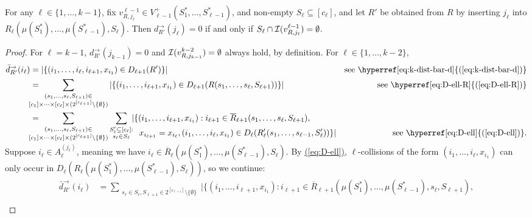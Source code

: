\documentclass{article}
\newcommand{\eq}[1]{\hyperref[eq:#1]{(\ref*{eq:#1})}}
\renewcommand{\>}{\rangle}
\newcommand{\<}{\langle}
\renewcommand{\(}{\left(}
\renewcommand{\)}{\right)}
\begin{document}
\begin{lemma}\label{lem:faults-equiv}
For any $\ell\in\{1,\dots,k-1\}$, fix $v^{\ell-1}_{R,j_{\ell}}\in V_{\ell-1}^+(S_1^*,\dots,S_{\ell-1}^*)$, and non-empty $S_{\ell}\subseteq [c_{\ell}]$, and let $R'$ be obtained from $R$ by inserting $j_{\ell}$ into $R_{\ell}(\mu(S_1^*),\dots,\mu(S_{\ell-1}^*),S_{\ell})$. Then $d^{\rightarrow}_{R'}(j_{\ell})=0$ if and only if $S_{\ell}\cap {\cal I}(v^{\ell-1}_{R,j_{\ell}})=\emptyset$. 
\end{lemma}
\begin{proof}
For $\ell=k-1$, $d_{R'}^{\rightarrow}(j_{k-1})=0$ and ${\cal I}(v^{k-2}_{R,j_{k-1}})=\emptyset$ always hold, by definition. 
For $\ell\in\{1,\dots,k-2\}$,
\begin{align*}
\bar{d}_{R'}^{\rightarrow}(i_{\ell}) &= |\{(i_1,\dots,i_{\ell},i_{\ell+1},x_{i_1})\in D_{\ell+1}(R')\}| & \mbox{see \eq{k-dist-bar-d}}\\
&= \!\!\!\!\!\!\!\!\!\sum_{\substack{(s_1,\dots,s_{\ell},S_{\ell+1})\in\\ [c_1]\times\dots\times[c_{\ell}]\times (2^{[c_{\ell+1}]}\setminus\{\emptyset\})}}
|\{(i_1,\dots,i_{\ell+1},x_{i_1})\in D_{\ell+1}(R(s_1,\dots,s_{\ell},S_{\ell+1}))\}| & \mbox{see \eq{D-ell-R}}\\
&= \!\!\!\!\!\!\!\!\!\sum_{\substack{(s_1,\dots,s_{\ell},S_{\ell+1})\in\\ [c_1]\times\dots\times[c_{\ell}]\times (2^{[c_{\ell+1}]}\setminus\{\emptyset\})}}
\sum_{\substack{S_{\ell}'\subseteq[c_{\ell}]:\\ s_{\ell}\in S_{\ell}}}\!\!
|\{(i_1,\dots,i_{\ell+1},x_{i_1}):  i_{\ell+1}\in\overline{R}_{\ell+1}(s_1,\dots,s_{\ell},S_{\ell+1}),\\[-20pt]
&\qquad\qquad\qquad\qquad\qquad\qquad\quad\, x_{i_{\ell+1}}=x_{i_{\ell}}, (i_1,\dots,i_{\ell},x_{i_1})\in D_{\ell}(R_{\ell}'(s_1,\dots,s_{\ell-1},S_{\ell}'))\}| & \mbox{see \eq{D-ell}}.
\end{align*}
Suppose $i_{\ell}\in A_{\ell}^{(j_{\ell})}$, meaning we have $i_{\ell}\in \overline{R}_{\ell}(\mu(S_1^*),\dots,\mu(S_{\ell-1}^*),S_{\ell})$. By \eq{D-ell},
$\ell$-collisions of the form $(i_1,\dots,i_{\ell},x_{i_1})$ can only occur in $D_{\ell}({R}_{\ell}(\mu(S_1^*),\dots,\mu(S_{\ell-1}^*),S_{\ell}))$, so we continue:
\begin{align*}
\bar{d}_{R'}^{\rightarrow}(i_{\ell}) &= \sum_{\substack{s_{\ell}\in S_{\ell},S_{\ell+1}\in2^{[c_{\ell+1}]}\setminus\{\emptyset\}}}
|\{(i_1,\dots,i_{\ell+1},x_{i_1}):  i_{\ell+1}\in\overline{R}_{\ell+1}(\mu(S_1^*),\dots,\mu(S_{\ell-1}^*),s_{\ell},S_{\ell+1}),\\[-17pt]

\end{align*}
\end{proof}
\end{document}
